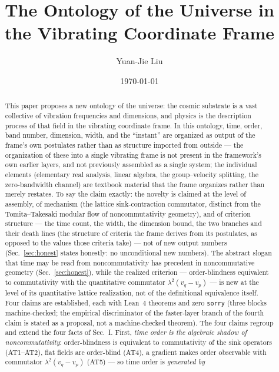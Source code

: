 \documentclass[aps,prd,preprint,superscriptaddress,amsmath,amssymb]{revtex4-2}
\begin{document}
\title{The Ontology of the Universe in the Vibrating Coordinate Frame}

\author{Yuan-Jie Liu}

\date{\today}

\begin{abstract}
This paper proposes a new ontology of the universe: the cosmic
substrate is a vast collective of vibration frequencies and
dimensions, and physics is the description process of that field in
the vibrating coordinate frame.  In this ontology, time, order, band
number, dimension, width, and the ``instant'' are organized as output
of the frame's own postulates rather than as structure imported from
outside --- the organization of these into a single vibrating frame is
not present in the framework's own earlier layers, and not previously
assembled as a single system; the individual elements (elementary
real analysis, linear algebra, the group--velocity splitting, the
zero-bandwidth channel) are textbook material that the frame
organizes rather than merely restates.  To say the claim exactly:
the novelty is claimed at the level of assembly, of mechanism (the
lattice sink-contraction commutator, distinct from the Tomita--Takesaki
modular flow of noncommutativity geometry), and of criterion
structure --- the time count, the width, the dimension bound, the
two branches and their death lines (the structure of criteria the
frame derives from its postulates, as opposed to the values those
criteria take) --- not of new output numbers
(Sec.~\ref{sec:honest} states honestly: no unconditional new numbers).  The
abstract slogan that time may be read from
noncommutativity has precedent in noncommutative geometry
(Sec.~\ref{sec:honest}), while the realized criterion --- order-blindness
equivalent to commutativity with the quantitative commutator
$\lambda^2(v_q-v_p)$ --- is new at the level of its quantitative
lattice realization, not of the definitional equivalence itself.  Four claims are established,
each with Lean~4 theorems and zero
\texttt{sorry} (three blocks machine-checked; the empirical
discriminator of the faster-layer branch of the fourth claim is
stated as a proposal, not a machine-checked theorem).  The four
claims regroup and extend the four facts of Sec.~I.
First, \emph{time order is the algebraic shadow
of noncommutativity}: order-blindness is equivalent to commutativity
of the sink operators (AT1--AT2), flat fields are order-blind (AT4),
a gradient makes order observable with commutator
$\lambda^2(v_q-v_p)$ (AT5) --- so time order is \emph{generated by
}
\end{abstract}
\end{document}
